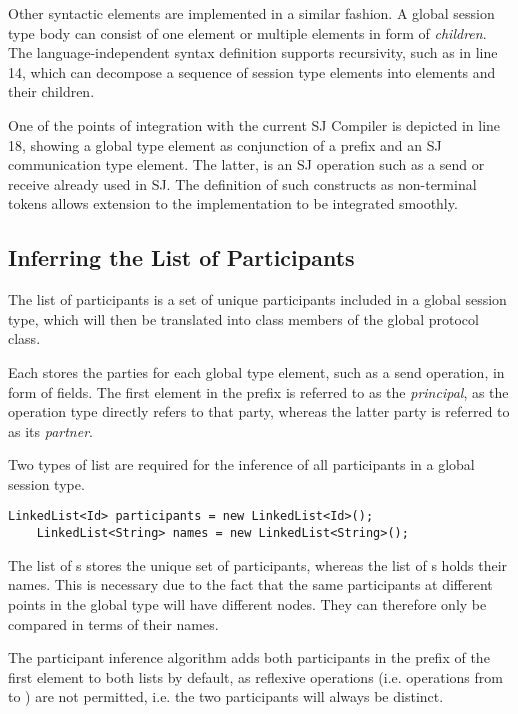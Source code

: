 Other syntactic elements are implemented in a similar fashion. A global session type body can consist of one element or multiple elements in form of \textit{children}. The language-independent syntax definition supports recursivity, such as in line 14, which can decompose a sequence of session type elements into elements and their children.

One of the points of integration with the current SJ Compiler is depicted in line 18, showing a global type element as conjunction of a prefix and an SJ communication type element. The latter, is an SJ operation such as a send or receive already used in SJ. The definition of such constructs as non-terminal tokens allows extension to the implementation to be integrated smoothly.  


\subsection{Inferring the List of Participants}
\label{subsec:inference}

The list of participants is a set of unique participants included in a global session type, which will then be translated into class members of the global protocol class. 

Each  stores the parties for each global type element, such as a send operation, in form of  fields. The first element in the prefix is referred to as the \textit{principal}, as the operation type directly refers to that party, whereas the latter party is referred to as its \textit{partner}.

Two types of list are required for the inference of all participants in a global session type. 

\begin{lstlisting}[basicstyle=\LISTINGSTYLE]
	LinkedList<Id> participants = new LinkedList<Id>();
	LinkedList<String> names = new LinkedList<String>();
\end{lstlisting}

The list of s stores the unique set of participants, whereas the list of s holds their names. This is necessary due to the fact that the same participants at different points in the global type will have different  nodes. They can therefore only be compared in terms of their names.

The participant inference algorithm adds both participants in the prefix of the first element to both lists by default, as reflexive operations (i.e. operations from  to ) are not permitted, i.e. the two participants will always be distinct. 


